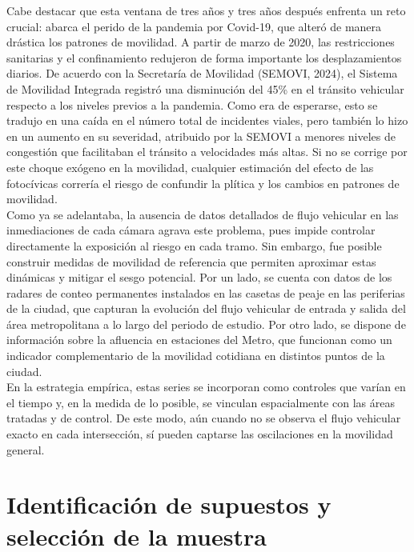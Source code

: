 Cabe destacar que esta ventana de tres años y tres años después enfrenta un reto crucial: abarca el perido de la pandemia por Covid-19, que alteró de manera drástica los patrones de movilidad. A partir de marzo de 2020, las restricciones sanitarias y el confinamiento redujeron de forma importante los desplazamientos diarios. De acuerdo con la Secretaría de Movilidad (SEMOVI, 2024), el Sistema de Movilidad Integrada registró una disminución del 45\% en el tránsito vehicular respecto a los niveles previos a la pandemia. Como era de esperarse, esto se tradujo en una caída en el número total de incidentes viales, pero también lo hizo en un aumento en su severidad, atribuido por la SEMOVI a menores niveles de congestión que facilitaban el tránsito a velocidades más altas. Si no se corrige por este choque exógeno en la movilidad, cualquier estimación del efecto de las fotocívicas correría el riesgo de confundir la plítica y los cambios en patrones de movilidad.\\

Como ya se adelantaba, la ausencia de datos detallados de flujo vehicular en las inmediaciones de cada cámara agrava este problema, pues impide controlar directamente la exposición al riesgo en cada tramo. Sin embargo, fue posible construir medidas de movilidad de referencia que permiten aproximar estas dinámicas y mitigar el sesgo potencial. Por un lado, se cuenta con datos de los radares de conteo permanentes instalados en las casetas de peaje en las periferias de la ciudad, que capturan la evolución del flujo vehicular de entrada y salida del área metropolitana a lo largo del periodo de estudio. Por otro lado, se dispone de información sobre la afluencia en estaciones del Metro, que funcionan como un indicador complementario de la movilidad cotidiana en distintos puntos de la ciudad.\\

En la estrategia empírica, estas series se incorporan como controles que varían en el tiempo y, en la medida de lo posible, se vinculan espacialmente con las áreas tratadas y de control. De este modo, aún cuando no se observa el flujo vehicular exacto en cada intersección, sí pueden captarse las oscilaciones en la movilidad general.

\section{Identificación de supuestos y selección de la muestra}
